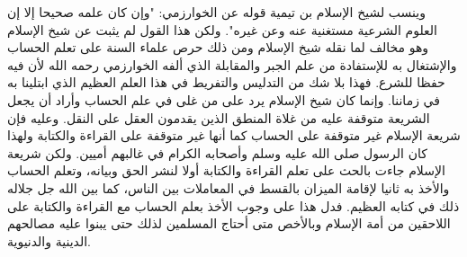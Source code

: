 وينسب لشيخ الإسلام بن تيمية قوله عن الخوارزمي: "وإن كان علمه صحيحا إلا إن العلوم الشرعية مستغنية عنه وعن غيره". ولكن هذا القول لم يثبت عن شيخ الإسلام وهو مخالف لما نقله شيخ الإسلام ومن ذلك حرص علماء السنة على تعلم الحساب والإشتغال به للإستفادة من علم الجبر والمقابلة الذي ألفه الخوارزمي رحمه الله لأن فيه حفظا للشرع. فهذا بلا شك من التدليس والتفريط في هذا العلم العظيم الذي ابتلينا به في زماننا. وإنما كان شيخ الإسلام يرد على من غلى في علم الحساب وأراد أن يجعل الشريعة متوقفة عليه من غلاة المنطق الذين يقدمون العقل على النقل. وعليه فإن شريعة الإسلام غير متوقفة على الحساب كما أنها غير متوقفة على القراءة والكتابة ولهذا كان الرسول صلى الله عليه وسلم وأصحابه الكرام في غالبهم أميين. ولكن شريعة الإسلام جاءت بالحث على تعلم القراءة والكتابة أولا لنشر الحق وبيانه، وتعلم الحساب والأخذ به ثانيا لإقامة الميزان بالقسط في المعاملات بين الناس، كما بين الله جل جلاله ذلك في كتابه العظيم. فدل هذا على وجوب الأخذ بعلم الحساب مع القراءة والكتابة على اللاحقين من أمة الإسلام وبالأخص متى أحتاج المسلمين لذلك حتى يبنوا عليه مصالحهم الدينية والدنيوية.

